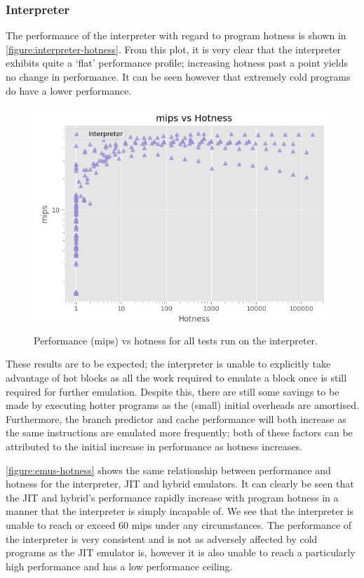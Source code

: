 \subsubsection{Interpreter}
\label{section:perf-interpreter}

The performance of the interpreter with regard to program hotness is shown in \autoref{figure:interpreter-hotness}. From this plot, it is very clear that the interpreter exhibits quite a `flat' performance profile; increasing hotness past a point yields no change in performance. It can be seen however that extremely cold programs do have a lower performance.

\begin{figure}[H]
    \centering
    \includegraphics[scale=0.75]{output/graphs/scatter/single/interpreter/hotness.png}
    \caption{Performance (mips) vs hotness for all tests run on the interpreter.}
    \label{figure:interpreter-hotness}
\end{figure}

These results are to be expected; the interpreter is unable to explicitly take advantage of hot blocks as all the work required to emulate a block once is still required for further emulation. Despite this, there are still some savings to be made by executing hotter programs as the (small) initial overheads are amortised. Furthermore, the branch predictor and cache performance will both increase as the same instructions are emulated more frequently; both of these factors can be attributed to the initial increase in performance as hotness increases.

\autoref{figure:emus-hotness} shows the same relationship between performance and hotness for the interpreter, JIT and hybrid emulators. It can clearly be seen that the JIT and hybrid's performance rapidly increase with program hotness in a manner that the interpreter is simply incapable of. We see that the interpreter is unable to reach or exceed 60 mips under any circumstances. The performance of the interpreter is very consistent and is not as adversely affected by cold programs as the JIT emulator is, however it is also unable to reach a particularly high performance and has a low performance ceiling.

